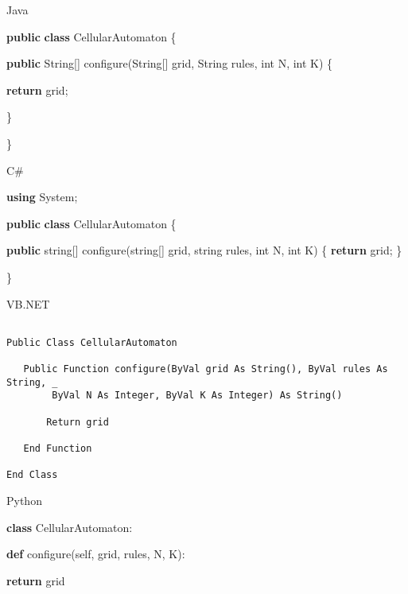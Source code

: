 \documentclass[]{article}
\newenvironment{Shaded}{}{}
\newcommand{\BuiltInTok}[1]{#1}
\newcommand{\ControlFlowTok}[1]{\textcolor[rgb]{0.00,0.44,0.13}{\textbf{#1}}}
\newcommand{\DataTypeTok}[1]{\textcolor[rgb]{0.56,0.13,0.00}{#1}}
\newcommand{\FunctionTok}[1]{\textcolor[rgb]{0.02,0.16,0.49}{#1}}
\newcommand{\KeywordTok}[1]{\textcolor[rgb]{0.00,0.44,0.13}{\textbf{#1}}}
\newcommand{\NormalTok}[1]{#1}
\newcommand{\VariableTok}[1]{\textcolor[rgb]{0.10,0.09,0.49}{#1}}
\begin{document}
Java

\begin{Shaded}
\begin{Highlighting}[]

\KeywordTok{public} \KeywordTok{class}\NormalTok{ CellularAutomaton \{}

   \KeywordTok{public} \BuiltInTok{String}\NormalTok{[] }\FunctionTok{configure}\NormalTok{(}\BuiltInTok{String}\NormalTok{[] grid, }\BuiltInTok{String}\NormalTok{ rules, }\DataTypeTok{int}\NormalTok{ N, }\DataTypeTok{int}\NormalTok{ K) \{}

       \KeywordTok{return}\NormalTok{ grid;}

\NormalTok{   \}}

\NormalTok{\}}
\end{Highlighting}
\end{Shaded}

C\#

\begin{Shaded}
\begin{Highlighting}[]

\KeywordTok{using}\NormalTok{ System;}

\KeywordTok{public} \KeywordTok{class}\NormalTok{ CellularAutomaton \{}

   \KeywordTok{public} \DataTypeTok{string}\NormalTok{[] }\FunctionTok{configure}\NormalTok{(}\DataTypeTok{string}\NormalTok{[] grid, }\DataTypeTok{string}\NormalTok{ rules, }\DataTypeTok{int}\NormalTok{ N, }\DataTypeTok{int}\NormalTok{ K) \{}
       \KeywordTok{return}\NormalTok{ grid;}
\NormalTok{   \}}

\NormalTok{\}}
\end{Highlighting}
\end{Shaded}

VB.NET

\begin{verbatim}

Public Class CellularAutomaton

   Public Function configure(ByVal grid As String(), ByVal rules As String, _
        ByVal N As Integer, ByVal K As Integer) As String()

       Return grid

   End Function

End Class
\end{verbatim}

Python

\begin{Shaded}
\begin{Highlighting}[]

\KeywordTok{class}\NormalTok{ CellularAutomaton:}

   \KeywordTok{def}\NormalTok{ configure(}\VariableTok{self}\NormalTok{, grid, rules, N, K):}

       \ControlFlowTok{return}\NormalTok{ grid}
\end{Highlighting}
\end{Shaded}
\end{document}
